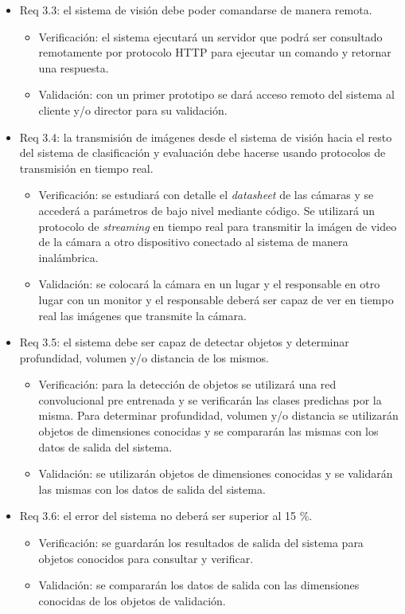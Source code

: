 \documentclass[
11pt, %
]{charter}
\begin{document}
\begin{itemize}
\item Req 3.3: el sistema de visión debe poder comandarse de manera remota.
\begin{itemize}
	\item Verificación: el sistema ejecutará un servidor que podrá ser consultado remotamente por protocolo HTTP para ejecutar un comando y retornar una respuesta. 
	\item Validación: con un primer prototipo se dará acceso remoto del sistema al cliente y/o director para su validación.
\end{itemize}

\item Req 3.4: la transmisión de imágenes desde el sistema de visión hacia el resto del sistema de clasificación y evaluación debe hacerse usando protocolos de transmisión en tiempo real.
\begin{itemize}
	\item Verificación: se estudiará con detalle el \emph{datasheet} de las cámaras y se accederá a parámetros de bajo nivel mediante código. Se utilizará un protocolo de \emph{streaming} en tiempo real para transmitir la imágen de video de la cámara a otro dispositivo conectado al sistema de manera inalámbrica.
	\item Validación: se colocará la cámara en un lugar y el responsable en otro lugar con un monitor y el responsable deberá ser capaz de ver en tiempo real las imágenes que transmite la cámara.
\end{itemize}

\item Req 3.5: el sistema debe ser capaz de detectar objetos y determinar profundidad, volumen y/o distancia de los mismos.
\begin{itemize}
	\item Verificación: para la detección de objetos se utilizará una red convolucional pre entrenada y se verificarán las clases predichas por la misma. Para determinar profundidad, volumen y/o distancia se utilizarán objetos de dimensiones conocidas y se compararán las mismas con los datos de salida del sistema.
	\item Validación: se utilizarán objetos de dimensiones conocidas y se validarán las mismas con los datos de salida del sistema.
\end{itemize}

\item Req 3.6: el error del sistema no deberá ser superior al 15 \%.
\begin{itemize}
	\item Verificación: se guardarán los resultados de salida del sistema para objetos conocidos para consultar y verificar.
	\item Validación: se compararán los datos de salida con las dimensiones conocidas de los objetos de validación.
\end{itemize}



\end{itemize}
\end{document}

